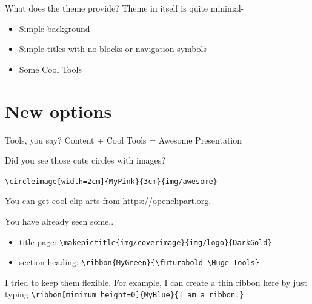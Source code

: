 \documentclass[xetex, aspectratio=169]{beamer}
\begin{document}
\begin{frame}[fragile]{What does the theme provide?}
	Theme in itself is quite minimal-
	\begin{itemize}
		\item Simple background
		\item Simple titles with no blocks or navigation symbols
		\item \alert{Some Cool Tools}
	\end{itemize}
	
\end{frame}

\section{New options}
\begin{frame}
	\vspace{2\baselineskip}
\end{frame}

\begin{frame}[fragile]{Tools, you say?}
\centering
	\alert{Content + Cool Tools = Awesome Presentation}\vspace*{\baselineskip}
	
		Did you see those cute circles with images?

\verb|\circleimage[width=2cm]{MyPink}{3cm}{img/awesome}| \vspace*{\baselineskip}


		
		You can get cool clip-arts from \url{https://openclipart.org}.

	
\end{frame}

\begin{frame}[fragile]{You have already seen some..}
	\centering 
	\begin{itemize}
		\item title page: \verb|\makepictitle{img/coverimage}{img/logo}{DarkGold}|
		\item section heading: \verb|\ribbon{MyGreen}{\futurabold \Huge Tools}|
	\end{itemize}
	I tried to keep them flexible. For example, I can create a thin ribbon here by just typing \verb|\ribbon[minimum height=0]{MyBlue}{I am a ribbon.}|.

\end{frame}
\end{document}
